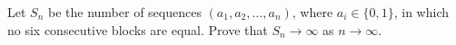 Let $S_n$ be the number of sequences $(a_1, a_2, \ldots, a_n)$, where $a_i \in \{0, 1\}$, in which no six consecutive blocks are equal. Prove that $S_n \to \infty$ as $n \to \infty$.
